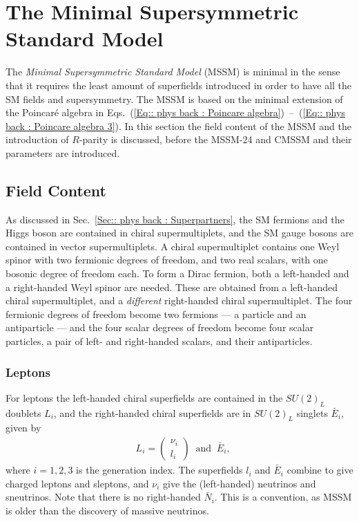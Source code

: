 \documentclass[twoside,english]{uiofysmaster}
\begin{document}
\section{The Minimal Supersymmetric Standard Model}

The \textit{Minimal Supersymmetric Standard Model} (MSSM) is minimal in the sense that it requires the least amount of superfields introduced in order to have all the SM fields and supersymmetry. The MSSM is based on the minimal extension of the Poincar\'{e} algebra in Eqs.~(\ref{Eq:: phys back : Poincare algebra})~--~(\ref{Eq:: phys back : Poincare algebra 3}). In this section the field content of the MSSM and the introduction of $R$-parity is discussed, before the MSSM-24 and CMSSM and their parameters are introduced.  


\subsection{Field Content}

As discussed in Sec.~\ref{Sec:: phys back : Superpartners}, the SM fermions and the Higgs boson are contained in chiral supermultiplets, and the SM gauge bosons are contained in vector supermultiplets. A chiral supermultiplet contains one Weyl spinor with two fermionic degrees of freedom, and two real scalars, with one bosonic degree of freedom each. To form a Dirac fermion, both a left-handed and a right-handed Weyl spinor are needed. These are obtained from a left-handed chiral supermultiplet, and a \textit{different} right-handed chiral supermultiplet. The four fermionic degrees of freedom become two fermions --- a particle and an antiparticle --- and the four scalar degrees of freedom become four scalar particles, a pair of left- and right-handed scalars, and their antiparticles.  

\subsubsection{Leptons}

For leptons the left-handed chiral superfields are contained in the $SU(2)_L$ doublets $L_i$, and the right-handed chiral superfields are in $SU(2)_L$ singlets $\bar{E}_i$, given by 
\begin{align}
&L_i = \begin{pmatrix}
\nu_i\\
l_i
\end{pmatrix}
~\text{ and } ~
\bar{E}_i,
\end{align}
where $i=1,2,3$ is the generation index. The superfields $l_i$ and $\bar{E}_i$ combine to give charged leptons and sleptons, and $\nu_i$ give the (left-handed) neutrinos and sneutrinos. Note that there is no right-handed $\bar{N}_i$. This is a convention, as MSSM is older than the discovery of massive neutrinos. 
\end{document}
